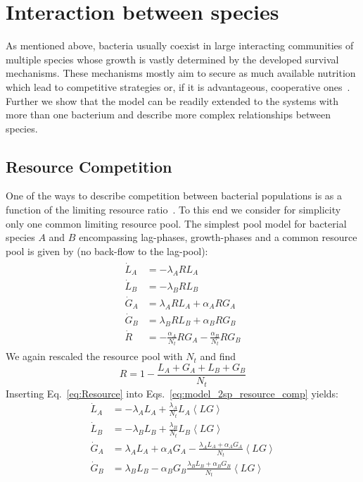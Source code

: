 \documentclass[10pt,twocolumn,5p]{elsarticle}
\numberwithin{equation}{section}
\begin{document}
\section{Interaction between species}
As mentioned above, bacteria usually coexist in large interacting communities of multiple species whose growth is vastly determined by the developed survival mechanisms.
These mechanisms mostly aim to secure as much available nutrition which lead to competitive strategies or, if it is advantageous, cooperative ones~\cite{hibbing_bacterial_2010, stubbendieck_bacterial_2016}.
Further we show that the model can be readily extended to the systems with more than one bacterium and describe more complex relationships between species.
%
\subsection{Resource Competition}
One of the ways to describe competition between bacterial populations is as a function of the limiting resource ratio~\cite{tilman_resource_1977, smith_effects_2002,ghoul_ecology_2016}.
To this end we consider for simplicity only one common limiting resource pool.
The simplest pool model for bacterial species $A$ and $B$ encompassing lag-phases, growth-phases and a common resource pool is given by (no back-flow to the lag-pool):
\begin{align}
    \begin{split}
        \dot{L}_A &= - \lambda_A R L_A\\
        \dot{L}_B &= - \lambda_B R L_B \\
        \dot{G}_A &= \lambda_A R L_A +\alpha_A R G_A\\
        \dot{G}_B &= \lambda_B R L_B +\alpha_B R G_B\\
        \dot{R} &=-\frac{\alpha_A}{N_t} R G_A-\frac{\alpha_B}{N_t} R G_B
    \end{split}
    \label{eq:model_2sp_resource_comp}
\end{align}
We again rescaled the resource pool with $N_t$ and find
\begin{equation}
    R =1-\frac{L_A+G_A+L_B+G_B}{N_t}
    \label{eq:Resource}
\end{equation}
Inserting Eq.~\ref{eq:Resource} into Eqs.~\ref{eq:model_2sp_resource_comp} yields:
\begin{align}
    \dot{L}_A &= -\lambda_A  L_A + \frac{\lambda_A}{N_t}L_A\left<LG\right>\\
    \dot{L}_B &= -\lambda_B L_B + \frac{\lambda_B}{N_t}L_B \left<LG\right>\\
    \dot{G}_A &=  \lambda_A  L_A + \alpha_A G_A - \frac{\lambda_A L_A + \alpha_A G_A}{N_t} \left<LG\right>\\
    \dot{G}_B &=  \lambda_B L_B - \alpha_B G_B \frac{\lambda_B L_B + \alpha_B G_B}{N_t}\left<LG\right>
\end{align}
\end{document}
